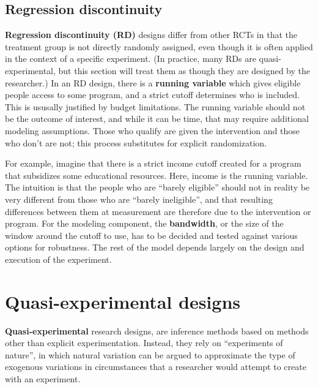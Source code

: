 \subsection{Regression discontinuity}

\textbf{Regression discontinuity (RD)} designs differ from other RCTs
in that the treatment group is not directly randomly assigned,
even though it is often applied in the context of a specific experiment.
(In practice, many RDs are quasi-experimental, but this section
will treat them as though they are designed by the researcher.)
In an RD design, there is a \textbf{running variable}
which gives eligible people access to some program,
and a strict cutoff determines who is included.\cite{lee2010regression}
This is ususally justified by budget limitations.
The running variable should not be the outcome of interest,
and while it can be time, that may require additional modeling assumptions.
Those who qualify are given the intervention and those who don't are not;
this process substitutes for explicit randomization.

For example, imagine that there is a strict income cutoff created
for a program that subsidizes some educational resources.
Here, income is the running variable.
The intuition is that the people who are ``barely eligible''
should not in reality be very different from those who are ``barely ineligible'',
and that resulting differences between them at measurement
are therefore due to the intervention or program.\cite{imbens2008regression}
For the modeling component, the \textbf{bandwidth},
or the size of the window around the cutoff to use,
has to be decided and tested against various options for robustness.
The rest of the model depends largely on the design and execution of the experiment.


\section{Quasi-experimental designs}

\textbf{Quasi-experimental} research designs,
are inference methods based on methods other than explicit experimentation.
Instead, they rely on ``experiments of nature'',
in which natural variation can be argued to approximate
the type of exogenous variations in circumstances
that a researcher would attempt to create with an experiment.\cite{dinardo2016natural}

